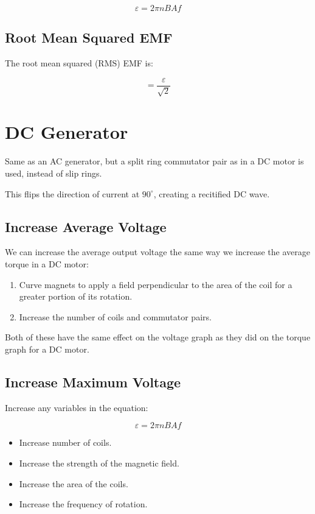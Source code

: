 \documentclass[a4paper,11pt]{report}
\begin{document}
$$
\varepsilon = 2\pi n BA f
$$

\subsection{Root Mean Squared EMF}

The root mean squared (RMS) EMF is:

$$
= \frac{\varepsilon}{\sqrt{2}}
$$


\section{DC Generator}

Same as an AC generator, but a split ring commutator pair as in a DC motor is
used, instead of slip rings.

This flips the direction of current at $90^\circ$, creating a recitified DC
wave.

\subsection{Increase Average Voltage}

We can increase the average output voltage the same way we increase the average
torque in a DC motor:

\begin{enumerate}
\item Curve magnets to apply a field perpendicular to the area of the coil for
	a greater portion of its rotation.
\item Increase the number of coils and commutator pairs.
\end{enumerate}

Both of these have the same effect on the voltage graph as they did on the
torque graph for a DC motor.

\subsection{Increase Maximum Voltage}

Increase any variables in the equation:

$$
\varepsilon = 2\pi n BA f
$$

\begin{itemize}
\item Increase number of coils.
\item Increase the strength of the magnetic field.
\item Increase the area of the coils.
\item Increase the frequency of rotation.
\end{itemize}
\end{document}
